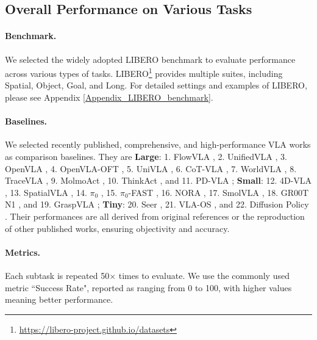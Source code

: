 \subsection{Overall Performance on Various Tasks}\label{sec42}

\paragraph{Benchmark.}\label{sec421} 
We selected the widely adopted LIBERO benchmark \citep{LIBERO-2023} to evaluate performance across various types of tasks. LIBERO\footnote{\url{https://libero-project.github.io/datasets}} provides multiple suites, including Spatial, Object, Goal, and Long. For detailed settings and examples of LIBERO, please see Appendix \ref{Appendix_LIBERO_benchmark}.

\paragraph{Baselines.}\label{Longtask_baselines} 

We selected recently published, comprehensive, and high-performance VLA works as comparison baselines. They are \textbf{Large}: 1. FlowVLA \citep{FlowVLA-2025}, 2. UnifiedVLA \citep{UnifiedVLA-2025}, 3. OpenVLA \citep{OpenVLA-2024}, 4. OpenVLA-OFT \citep{OpenVLA-OFT-2025}, 5. UniVLA \citep{UniVLA-2025}, 6. CoT-VLA \citep{CoT-VLA-2025}, 7. WorldVLA \citep{WorldVLA-2025}, 8. TraceVLA \citep{TraceVLA-2025}, 9. MolmoAct \citep{MolmoAct-2025}, 10. ThinkAct \citep{ThinkAct-2025}, and 11. PD-VLA \citep{PDVLA-2025}; \textbf{Small}: 12. 4D-VLA \citep{4D-VLA-2025}, 13. SpatialVLA \citep{SpatialVLA-2025}, 14. $\pi_0$ \citep{pi0-2025}, 15. $\pi_0$-FAST \citep{pi0-FAST-2025}, 16. NORA \citep{NORA-2025}, 17. SmolVLA \citep{SmolVLA-2025}, 18. GR00T N1 \citep{GR00T-N1-2025}, and 19. GraspVLA \citep{GraspVLA-2025}; \textbf{Tiny}: 20. Seer \citep{Seer-2025}, 21. VLA-OS \citep{VLA-OS-2025}, and 22. Diffusion Policy \citep{DP-2023}. Their performances are all derived from original references or the reproduction of other published works, ensuring objectivity and accuracy. 

\paragraph{Metrics.}\label{Longtask_metrics1} 
Each subtask is repeated 50$\times$ times to evaluate. We use the commonly used metric ``Success Rate", reported as ranging from 0 to 100, with higher values meaning better performance.

